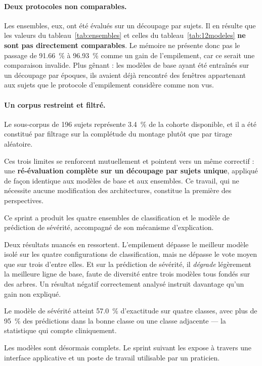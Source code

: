 \paragraph{Deux protocoles non comparables.} Les ensembles, eux, ont été évalués sur un
découpage par sujets. Il en résulte que les valeurs du tableau~\ref{tab:ensembles} et
celles du tableau~\ref{tab:12modeles} \textbf{ne sont pas directement comparables}. Le
mémoire ne présente donc pas le passage de \SI{91,66}{\percent} à \SI{96,93}{\percent}
comme un gain de l'empilement, car ce serait une comparaison invalide. Plus gênant : les
modèles de base ayant été entraînés sur un découpage par époques, ils avaient déjà
rencontré des fenêtres appartenant aux sujets que le protocole d'empilement considère
comme non vus.

\paragraph{Un corpus restreint et filtré.} Le sous-corpus de 196 sujets représente
\SI{3,4}{\percent} de la cohorte disponible, et il a été constitué par filtrage sur la
complétude du montage plutôt que par tirage aléatoire.

\medskip
\noindent
Ces trois limites se renforcent mutuellement et pointent vers un même correctif : une
\textbf{ré-évaluation complète sur un découpage par sujets unique}, appliqué de façon
identique aux modèles de base et aux ensembles. Ce travail, qui ne nécessite aucune
modification des architectures, constitue la première des perspectives.


Ce sprint a produit les quatre ensembles de classification et le modèle de prédiction de
sévérité, accompagné de son mécanisme d'explication.

Deux résultats nuancés en ressortent. L'empilement dépasse le meilleur modèle isolé sur
les quatre configurations de classification, mais ne dépasse le vote moyen que sur trois
d'entre elles. Et sur la prédiction de sévérité, il \emph{dégrade} légèrement la meilleure
ligne de base, faute de diversité entre trois modèles tous fondés sur des arbres. Un
résultat négatif correctement analysé instruit davantage qu'un gain non expliqué.

Le modèle de sévérité atteint \SI{57,0}{\percent} d'exactitude sur quatre classes, avec
plus de \SI{95}{\percent} des prédictions dans la bonne classe ou une classe adjacente ---
la statistique qui compte cliniquement.

Les modèles sont désormais complets. Le sprint suivant les expose à travers une interface
applicative et un poste de travail utilisable par un praticien.
